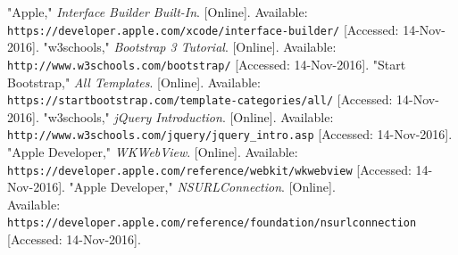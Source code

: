 \documentclass[letterpaper, 10pt,titlepage]{article}
\begin{document}
\newpage %
\begin{thebibliography}{9}

"Apple," \textit{Interface Builder Built-In}. [Online]. Available:
\texttt{https://developer.apple.com/xcode/interface-builder/} [Accessed: 14-Nov-2016].
"w3schools," \textit{Bootstrap 3 Tutorial}. [Online]. Available:
\texttt{http://www.w3schools.com/bootstrap/} [Accessed: 14-Nov-2016].
"Start Bootstrap," \textit{All Templates}. [Online]. Available:
\texttt{https://startbootstrap.com/template-categories/all/} [Accessed: 14-Nov-2016].
"w3schools," \textit{jQuery Introduction}. [Online]. Available:
\texttt{http://www.w3schools.com/jquery/jquery\_intro.asp} [Accessed: 14-Nov-2016].
"Apple Developer," \textit{WKWebView}. [Online]. Available:
\texttt{https://developer.apple.com/reference/webkit/wkwebview} [Accessed: 14-Nov-2016].
"Apple Developer," \textit{NSURLConnection}. [Online]. 
\\Available: \texttt{https://developer.apple.com/reference/foundation/nsurlconnection} [Accessed: 14-Nov-2016].














\end{thebibliography}
\end{document}
